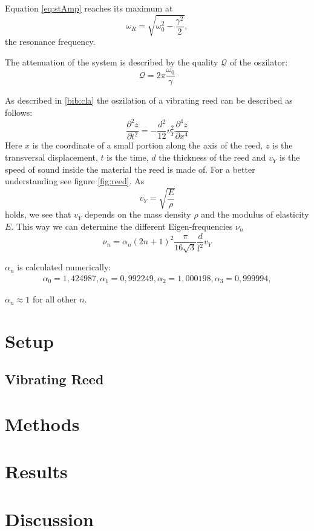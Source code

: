 \documentclass[a4paper,12pt]{article}
\begin{document}
Equation \ref{eq:stAmp} reaches its maximum at
\begin{equation}
 \omega_R = \sqrt{\omega_0^2 - \frac{\gamma^2}{2}} \mathrm{,}
\end{equation}
the resonance frequency.

The attenuation of the system is described by the quality $\mathcal{Q}$ of the oszilator:
\begin{equation}
 \mathcal{Q} = 2\pi\frac{\omega_0}{\gamma}
\end{equation}


As described in \ref{bib:cla} the oszilation of a vibrating reed can be described as follows:
\begin{equation}
 \frac{\partial^2 z}{\partial t^2} = -\frac{d^2}{12} v_Y^2 \frac{\partial^4 z}{\partial x^4}
\end{equation}
Here $x$ is the coordinate of a small portion along the axis of the reed, $z$ is the transversal displacement, $t$ is the time, $d$ the thickness of the reed and $v_Y$ is the speed of sound inside the material the reed is made of. For a better understanding see figure \ref{fig:reed}.
As 
\begin{equation}
 v_Y = \sqrt{\frac{E}{\rho}}
\end{equation}
holds, we see that $v_Y$ depends on the mass density $\rho$ and the modulus of elasticity $E$.
This way we can determine the different Eigen-frequencies $\nu_n$
\begin{equation}
 \nu_n = \alpha_n (2n+1)^2 \frac{\pi}{16\sqrt{3}} \frac{d}{l^2} v_Y
\end{equation}

$\alpha_n$ is calculated numerically:
\begin{eqnarray}
 \alpha_0 = 1,424987 \mathrm{,} \alpha_1 = 0,992249  \mathrm{,} \alpha_2 = 1,000198 \mathrm{,} \alpha_3 = 0,999994 \mathrm{,}
\end{eqnarray}

 $\alpha_n \approx 1$ for all other $n$.



\subsection{}

\section{Setup}
\label{sec:set}

\subsection{Vibrating Reed}
\label{sec:reed}


\section{Methods}
\label{sec:meth}


\section{Results}
\label{sec:res}


\section{Discussion}
\label{sec:disk}
\end{document}
